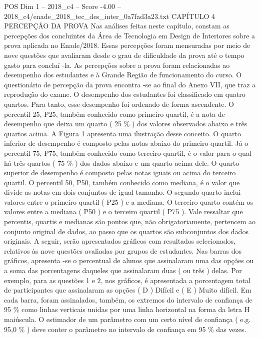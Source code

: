 \begin{textsample}{POS Dim 1 – 2018\_c4 – Score -4.00 – 2018\_c4/enade\_2018\_tec\_des\_inter\_0a7fad3a23.txt}  \label{ex:f1_pos_307}
CAPÍTULO 4 PERCEPÇÃO DA PROVA Nas análises feitas neste capítulo, constam as percepções dos concluintes da Área de Tecnologia em Design de Interiores sobre a prova aplicada no Enade/2018.
Essas percepções foram mensuradas por meio de nove questões que avaliaram desde o grau de dificuldade da prova até o tempo gasto para concluí -la.
As percepções sobre a prova foram relacionadas ao desempenho dos estudantes e à Grande Região de funcionamento do curso.
O questionário de percepção da prova encontra -se ao final do Anexo VII, que traz a reprodução do exame.
O desempenho dos estudantes foi classificado em quatro quartos.
Para tanto, esse desempenho foi ordenado de forma ascendente.
O percentil 25, P25, também conhecido como primeiro quartil, é a nota de desempenho que deixa um quarto ( 25 \% ) dos valores observados abaixo e três quartos acima.
A Figura 1 apresenta uma ilustração desse conceito.
O quarto inferior de desempenho é composto pelas notas abaixo do primeiro quartil.
Já o percentil 75, P75, também conhecido como terceiro quartil, é o valor para o qual há três quartos ( 75 \% ) dos dados abaixo e um quarto acima dele.
O quarto superior de desempenho é composto pelas notas iguais ou acima do terceiro quartil.
O percentil 50, P50, também conhecido como mediana, é o valor que divide as notas em dois conjuntos de igual tamanho.
O segundo quarto inclui valores entre o primeiro quartil ( P25 ) e a mediana.
O terceiro quarto contém os valores entre a mediana ( P50 ) e o terceiro quartil ( P75 ).
Vale ressaltar que percentis, quartis e medianas são pontos que, não obrigatoriamente, pertencem ao conjunto original de dados, ao passo que os quartos são subconjuntos dos dados originais.
A seguir, serão apresentados gráficos com resultados selecionados, relativos às nove questões avaliadas por grupos de estudantes.
Nas barras dos gráficos, apresenta -se o percentual de alunos que assinalaram uma das opções ou a soma das porcentagens daqueles que assinalaram duas ( ou três ) delas.
Por exemplo, para as questões 1 e 2, nos gráficos, é apresentada a porcentagem total de participantes que assinalaram as opções ( D ) Difícil e ( E ) Muito difícil.
Em cada barra, foram assinalados, também, os extremos do intervalo de confiança de 95 \% como linhas verticais unidas por uma linha horizontal na forma da letra H maiúscula.
O estimador de um parâmetro com um certo nível de confiança ( e.g. 95,0 \% ) deve conter o parâmetro no intervalo de confiança em 95 \% das vezes.

\end{textsample}
